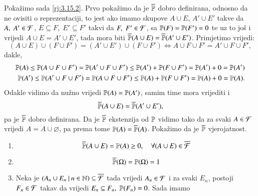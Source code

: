 \begin{rj}[\ref{zad:3.10}]
    Poka\v zimo sada \ref{rj:3.15.2}.
    Prvo poka\v zimo da je $\overline{\mathbb{P}}$ dobro definirana, odnosno da ne ovisiti o reprezentaciji, to jest ako imamo skupove $A \cup E$, $A' \cup E'$ takve da $A, \; A' \in \mathcal{F}$, $E \subseteq F, \; E' \subseteq F'$ takvi da $F, \; F' \in \mathcal{F}$, sa $\mathbb{P}({F}) = \mathbb{P}({F'}) = 0$ te uz to jo\v s i vrijedi $A \cup E = A' \cup E'$, tada mora biti $\overline{\mathbb{P}} (A \cup E) = \overline{\mathbb{P}} (A' \cup E')$.
    Primjetimo vrijedi:
    \begin{equation*}
        (A \cup E) \cup (F \cup F') = (A' \cup E') \cup (F \cup F') \iff A \cup F \cup F' = A' \cup F \cup F',
    \end{equation*}
    dakle,
    \begin{equation*}
        \begin{aligned}
            \mathbb{P}({A}) \leq \mathbb{P}({A \cup F \cup F'}) = \mathbb{P}({A' \cup F \cup F'}) \leq \mathbb{P}({A'}) + \mathbb{P}({F \cup F'}) = \mathbb{P}({A'}) + 0 = \mathbb{P}({A'})\\
            \mathbb{P}({A'}) \leq \mathbb{P}({A' \cup F \cup F'}) = \mathbb{P}({A \cup F \cup F'}) \leq \mathbb{P}({A}) + \mathbb{P}({F \cup F'}) = \mathbb{P}({A}) + 0 = \mathbb{P}({A}).
        \end{aligned}
    \end{equation*}
    Odakle vidimo da nu\v zno vrijedi $\mathbb{P}({A}) = \mathbb{P}({A'})$, samim time mora vrijediti i
    \begin{equation*}
        \overline{\mathbb{P}} (A \cup E) = \overline{\mathbb{P}} (A' \cup E'),  
    \end{equation*}
    pa je $\overline{\mathbb{P}}$ dobro definirana.
    Da je $\overline{\mathbb{P}}$ ekstenzija od $\mathbb{P}$ vidimo tako da za svaki $A \in \mathcal{F}$ vrijedi $A = A \cup \varnothing$, pa prema tome $\mathbb{P}({A}) = \overline{\mathbb{P}} (A)$.
    Poka\v zimo da je $\overline{\mathbb{P}}$ vjerojatnost.
    \begin{enumerate}[label=(\roman*)]
        \item
        \begin{equation*}
            \overline{\mathbb{P}} (A \cup E) = \mathbb{P}({A}) \geq 0, \quad \forall (A \cup E) \in \overline{\mathcal{F}}
        \end{equation*}
        \item
        \begin{equation*}
            \overline{\mathbb{P}} (\Omega) = \mathbb{P}({\Omega}) = 1
        \end{equation*}
        \item Neka je $({A_n \cup E_n} \: | \: {n \in \mathbb{N}}) \subseteq \overline{\mathcal{F}}$ tada vrijedi $A_n \in \mathcal{F}$ i za svaki $E_n$, postoji $F_n \in \mathcal{F}$ takav da vrijedi $E_n \subseteq F_n, \; \mathbb{P}({F_n}) = 0$. Sada imamo

\end{enumerate}
\end{rj}
